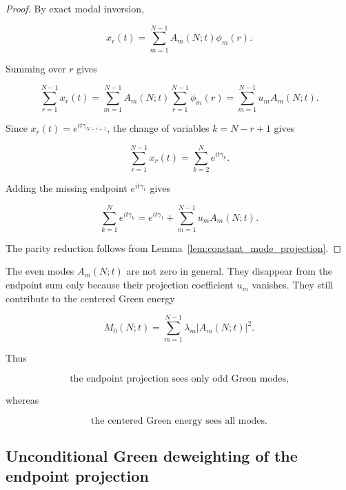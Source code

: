 \documentclass[11pt]{amsart}
\numberwithin{equation}{section}
\theoremstyle{plain}
\theoremstyle{definition}
\theoremstyle{remark}
\begin{document}
\begin{proof}
By exact modal inversion,

\begin{equation}
x_r(t)
=
\sum_{m=1}^{N-1}
A_m(N;t)\phi_m(r).
\end{equation}

Summing over \(r\) gives

\begin{equation}
\sum_{r=1}^{N-1}x_r(t)
=
\sum_{m=1}^{N-1}
A_m(N;t)
\sum_{r=1}^{N-1}\phi_m(r)
=
\sum_{m=1}^{N-1}u_mA_m(N;t).
\label{eq:constant_projection_modal_identity}
\end{equation}

Since \(x_r(t)=e^{it\gamma_{N-r+1}}\), the change of variables
\(k=N-r+1\) gives

\begin{equation}
\sum_{r=1}^{N-1}x_r(t)
=
\sum_{k=2}^{N}e^{it\gamma_k}.
\end{equation}

Adding the missing endpoint \(e^{it\gamma_1}\) gives

\begin{equation}
\sum_{k=1}^{N}e^{it\gamma_k}
=
e^{it\gamma_1}
+
\sum_{m=1}^{N-1}u_mA_m(N;t).
\end{equation}

The parity reduction follows from Lemma~\ref{lem:constant_mode_projection}.
\end{proof}

The even modes \(A_m(N;t)\) are not zero in general. They disappear from
the endpoint sum only because their projection coefficient \(u_m\)
vanishes. They still contribute to the centered Green energy

\begin{equation}
M_0(N;t)
=
\sum_{m=1}^{N-1}
\lambda_m|A_m(N;t)|^2.
\label{eq:centered_energy_all_modes_after_endpoint}
\end{equation}

Thus

\begin{equation}
\text{the endpoint projection sees only odd Green modes,}
\label{eq:endpoint_sees_odd_modes}
\end{equation}

whereas

\begin{equation}
\text{the centered Green energy sees all modes.}
\label{eq:centered_energy_sees_all_modes}
\end{equation}

\subsection{Unconditional Green deweighting of the endpoint projection}
\label{subsec:unconditional_green_deweighting_endpoint_projection}
\leavevmode\par\nobreak
\end{document}
